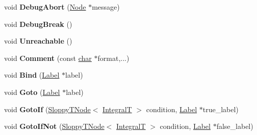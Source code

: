 \begin{DoxyCompactItemize}
void {\bfseries Debug\+Abort} (\mbox{\hyperlink{classv8_1_1internal_1_1compiler_1_1Node}{Node}} $\ast$message)
\item 
\mbox{\label{classv8_1_1internal_1_1compiler_1_1CodeAssembler_a7b722005413484cde9fc1539a99fec88}} 
void {\bfseries Debug\+Break} ()
\item 
\mbox{\label{classv8_1_1internal_1_1compiler_1_1CodeAssembler_ab100334005245e62990aff6d03b73642}} 
void {\bfseries Unreachable} ()
\item 
\mbox{\label{classv8_1_1internal_1_1compiler_1_1CodeAssembler_a72a94344a64eeb81239569dd8e6a7116}} 
void {\bfseries Comment} (const \mbox{\hyperlink{classchar}{char}} $\ast$format,...)
\item 
\mbox{\label{classv8_1_1internal_1_1compiler_1_1CodeAssembler_a6572a30661aef5712f61c781fec4017d}} 
void {\bfseries Bind} (\mbox{\hyperlink{classv8_1_1internal_1_1compiler_1_1CodeAssemblerLabel}{Label}} $\ast$label)
\item 
\mbox{\label{classv8_1_1internal_1_1compiler_1_1CodeAssembler_ae1fa6d3d694b68f55e037aaffc918adb}} 
void {\bfseries Goto} (\mbox{\hyperlink{classv8_1_1internal_1_1compiler_1_1CodeAssemblerLabel}{Label}} $\ast$label)
\item 
\mbox{\label{classv8_1_1internal_1_1compiler_1_1CodeAssembler_a08d446d75dc4a8fe9a95a3002cb54f1a}} 
void {\bfseries Goto\+If} (\mbox{\hyperlink{classv8_1_1internal_1_1compiler_1_1SloppyTNode}{Sloppy\+T\+Node}}$<$ \mbox{\hyperlink{structv8_1_1internal_1_1IntegralT}{IntegralT}} $>$ condition, \mbox{\hyperlink{classv8_1_1internal_1_1compiler_1_1CodeAssemblerLabel}{Label}} $\ast$true\+\_\+label)
\item 
\mbox{\label{classv8_1_1internal_1_1compiler_1_1CodeAssembler_a810a2e9c50d49350b7c76760e29f6235}} 
void {\bfseries Goto\+If\+Not} (\mbox{\hyperlink{classv8_1_1internal_1_1compiler_1_1SloppyTNode}{Sloppy\+T\+Node}}$<$ \mbox{\hyperlink{structv8_1_1internal_1_1IntegralT}{IntegralT}} $>$ condition, \mbox{\hyperlink{classv8_1_1internal_1_1compiler_1_1CodeAssemblerLabel}{Label}} $\ast$false\+\_\+label)

\end{DoxyCompactItemize}
